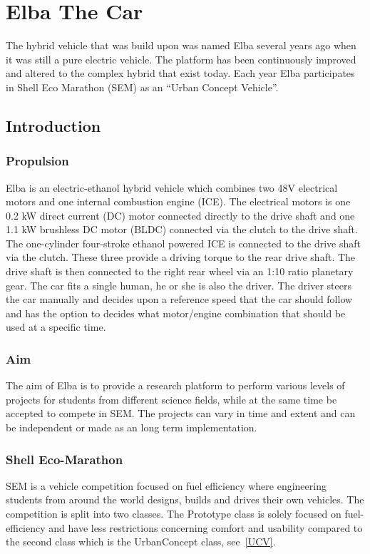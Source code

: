\chapter{Elba The Car}
The hybrid vehicle that was build upon was named Elba several years ago when it
was still a pure electric vehicle. The platform has been continuously improved
and altered to the complex hybrid that exist today. Each year Elba participates
in Shell Eco Marathon (SEM) as an ``Urban Concept Vehicle''.

\section{Introduction}
\subsection{Propulsion}
Elba is an electric-ethanol hybrid vehicle which combines two 48V electrical
motors and one internal combustion engine (ICE). The electrical motors is one
0.2 kW direct current (DC) motor connected directly to the drive shaft and one
1.1 kW brushless DC motor (BLDC) connected via the clutch to the drive shaft.
The one-cylinder four-stroke ethanol powered ICE is connected to the drive
shaft via the clutch. These three provide a driving torque to the rear drive
shaft. The drive shaft is then connected to the right rear wheel via an 1:10
ratio planetary gear. The car fits a single human, he or she is also the
driver. The driver steers the car manually and decides upon a reference speed
that the car should follow and has the option to decides what motor/engine
combination that should be used at a specific time.

\subsection{Aim}
The aim of Elba is to provide a research platform to perform various levels of
projects for students from different science fields, while at the same time be
accepted to compete in SEM\@. The projects can vary in time and
extent and can be independent or made as an long term implementation. 

\subsection{Shell Eco-Marathon}
SEM is a vehicle competition focused on fuel efficiency where engineering
students from around the world designs, builds and drives their own vehicles.
The competition is split into two classes. The Prototype class is solely
focused on fuel-efficiency and have less restrictions concerning comfort and
usability compared to the second class which is the UrbanConcept class,
see~\ref{UCV}.


